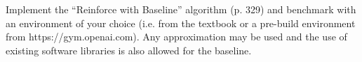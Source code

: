 
\begin{exercise}

\phantom{}

Implement the ``Reinforce with Baseline'' algorithm (p. 329) and benchmark
with an environment of your choice (i.e. from the textbook or a pre-build
environment from https://gym.openai.com). Any approximation may be used and
the use of existing software libraries is also allowed for the baseline.

\end{exercise}


\begin{solution}

\phantom{}

\end{solution}


